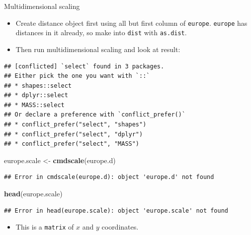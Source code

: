 \documentclass[ignorenonframetext,]{beamer}
\newenvironment{Shaded}{\begin{snugshade}}{\end{snugshade}}
\newcommand{\DecValTok}[1]{\textcolor[rgb]{0.00,0.00,0.81}{#1}}
\newcommand{\KeywordTok}[1]{\textcolor[rgb]{0.13,0.29,0.53}{\textbf{#1}}}
\newcommand{\NormalTok}[1]{#1}
\newcommand{\OperatorTok}[1]{\textcolor[rgb]{0.81,0.36,0.00}{\textbf{#1}}}
\newcommand{\StringTok}[1]{\textcolor[rgb]{0.31,0.60,0.02}{#1}}
\providecommand{\tightlist}{%
  \setlength{\itemsep}{0pt}\setlength{\parskip}{0pt}}
\begin{document}
\begin{frame}[fragile]{Multidimensional scaling}
\protect\hypertarget{multidimensional-scaling-2}{}

\begin{itemize}
\item
  Create distance object first using all but first column of
  \texttt{europe}. \texttt{europe} has distances in it already, so make
  into \texttt{dist} with \texttt{as.dist}.
\item
  Then run multidimensional scaling and look at result:
\end{itemize}

\begin{Shaded}
\end{Shaded}

\begin{verbatim}
## [conflicted] `select` found in 3 packages.
## Either pick the one you want with `::` 
## * shapes::select
## * dplyr::select
## * MASS::select
## Or declare a preference with `conflict_prefer()`
## * conflict_prefer("select", "shapes")
## * conflict_prefer("select", "dplyr")
## * conflict_prefer("select", "MASS")
\end{verbatim}

\begin{Shaded}
\begin{Highlighting}[]
\NormalTok{europe.scale <-}\StringTok{ }\KeywordTok{cmdscale}\NormalTok{(europe.d)}
\end{Highlighting}
\end{Shaded}

\begin{verbatim}
## Error in cmdscale(europe.d): object 'europe.d' not found
\end{verbatim}

\begin{Shaded}
\begin{Highlighting}[]
\KeywordTok{head}\NormalTok{(europe.scale)}
\end{Highlighting}
\end{Shaded}

\begin{verbatim}
## Error in head(europe.scale): object 'europe.scale' not found
\end{verbatim}

\begin{itemize}
\tightlist
\item
  This is a \texttt{matrix} of \(x\) and \(y\) coordinates.
\end{itemize}

\end{frame}
\end{document}
